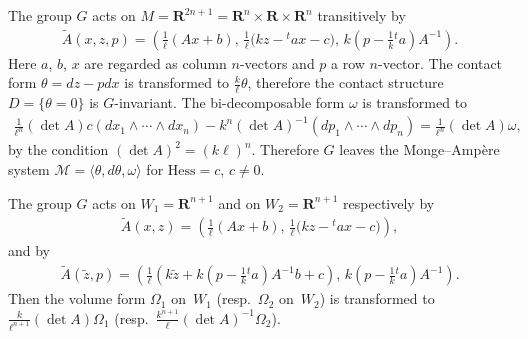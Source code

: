 \documentclass[11pt]{article}
\begin{document}
\begin{Rem}
The group $G$ acts on $M = {\mathbf{R}}^{2n+1} = {\mathbf{R}}^n \times {\mathbf{R}} \times {\mathbf{R}}^n$ transitively by
\begin{gather*}
\widetilde{A}(x, z, p) = \left(\frac{1}{\ell}(Ax + b), \, \frac{1}{\ell}\big(kz - {}^t\!ax - c\big), \, k\left(p - \frac{1}{k}{}^t\!a\right)A^{-1}\right).
\end{gather*}
Here $a$, $b$, $x$ are regarded as column $n$-vectors and $p$ a row $n$-vector.
The contact form $\theta = dz - pdx$ is transformed to
$\frac{k}{\ell}\theta$, therefore
the contact structure $D=\{ \theta =0 \}$ is $G$-invariant.
The bi-decomposable form $\omega$ is transformed to
\begin{gather*}
\frac{1}{\ell^n}(\det A)c(dx_1\wedge \cdots \wedge dx_{n})
-
k^n(\det A)^{-1}(dp_1\wedge \cdots \wedge dp_{n}) = \frac{1}{\ell^n}(\det A)  \omega,
\end{gather*}
by the condition $(\det A)^2 = (k\ell)^n$.
Therefore $G$ leaves the Monge--Amp{\`e}re system ${\mathcal M} = \langle \theta, d\theta, \omega\rangle$
for ${\mathrm{Hess}} = c$, $c \not= 0$.

The group $G$ acts on $W_1 = {\mathbf{R}}^{n+1}$ and on $W_2={\mathbf{R}}^{n+1}$ respectively by
\begin{gather*}
\widetilde{A}(x, z) = \left(\frac{1}{\ell}(Ax + b), \, \frac{1}{\ell}\big(kz - {}^t\!ax - c\big)\right),
\end{gather*}
and by
\begin{gather*}
\widetilde{A}(\tilde{z}, p) = \left(\frac{1}{\ell}\left(k\tilde{z} + k\left(p - \frac{1}{k}{}^t\!a\right)A^{-1}b + c\right), \, k\left(p - \frac{1}{k}{}^t\!a\right)A^{-1}\right).
\end{gather*}
Then the volume form $\Omega_1$ on~$W_1$ (resp.~$\Omega_2$ on~$W_2$)
is transformed to $\frac{k}{\ell^{n+1}}(\det A)\Omega_1$ (resp.\ $\frac{k^{n+1}}{\ell}(\det A)^{-1}\Omega_2$).
\end{Rem}
\end{document}
